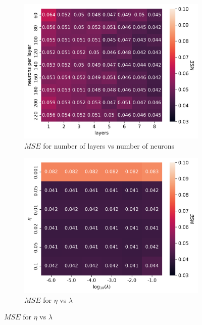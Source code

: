 \documentclass[11pt]{article}
\begin{document}
\begin{figure}[H]
    \begin{subfigure}{.5\textwidth}
        \centering
        \includegraphics[width=\textwidth]{../figures/franke_L_n_test_relu_MSE.png}
        \caption{$MSE$ for number of layers vs number of neurons}
        \label{fig:}
    \end{subfigure}
    \begin{subfigure}{.5\textwidth}
        \centering
        \includegraphics[width=\textwidth]{../figures/franke_eta_lmb_relu.png}
        \caption{$MSE$ for $\eta$ vs $\lambda$}
        \label{fig:}
    \end{subfigure}

\end{figure}
\end{document}
